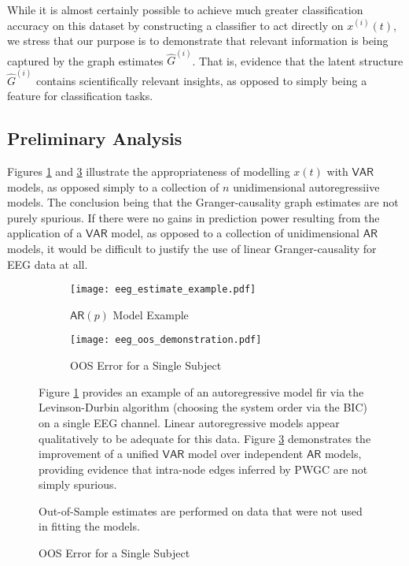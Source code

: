 \documentclass[12pt]{article}
\def\VAR{\mathsf{VAR}}  %
\begin{document}
While it is almost certainly possible to achieve much greater
classification accuracy on this dataset by constructing a classifier
to act directly on $x^{(i)}(t)$, we stress that our purpose is to
demonstrate that relevant information is being captured by the graph
estimates $\widehat{G}^{(i)}$.  That is, evidence that the latent
structure $\widehat{G}^{(i)}$ contains scientifically relevant
insights, as opposed to simply being a feature for classification
tasks.

\subsection{Preliminary Analysis}
Figures \ref{fig:ar_eeg_example} and \ref{fig:eeg_oos_error}
illustrate the appropriateness of modelling $x(t)$ with $\VAR$ models,
as opposed simply to a collection of $n$ unidimensional
autoregressiive models.  The conclusion being that the
Granger-causality graph estimates are not purely spurious.  If there
were no gains in prediction power resulting from the application of a
$\VAR$ model, as opposed to a collection of unidimensional
$\mathsf{AR}$ models, it would be difficult to justify the use of
linear Granger-causality for EEG data at all.

\begin{figure}
  \centering
  \begin{subfigure}[b]{0.45\textwidth}
    \caption{$\mathsf{AR}(p)$ Model Example}
    \label{fig:ar_eeg_example}
    \texttt{[image: eeg\_estimate\_example.pdf]}
  \end{subfigure}
  \begin{subfigure}[b]{0.45\textwidth}
    \caption{OOS Error for a Single Subject}
    \label{fig:eeg_oos_error}
    \texttt{[image: eeg\_oos\_demonstration.pdf]}
  \end{subfigure}

  {\scriptsize Figure \ref{fig:ar_eeg_example} provides an example of
    an autoregressive model fir via the Levinson-Durbin algorithm
    (choosing the system order via the BIC) on a single EEG channel.
    Linear autoregressive models appear qualitatively to be adequate
    for this data.  Figure \ref{fig:eeg_oos_error} demonstrates the
    improvement of a unified $\VAR$ model over independent
    $\mathsf{AR}$ models, providing evidence that intra-node edges
    inferred by PWGC are not simply spurious.

  Out-of-Sample estimates are performed on data that were not used in
  fitting the models.}
\end{figure}
\end{document}
